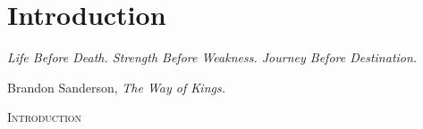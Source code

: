 \chapter{Introduction}
\label{ch:introduction}

\setlength{}
\epigraph{\itshape Life Before Death. Strength Before Weakness. Journey Before Destination.}{Brandon Sanderson, \textit{The Way of Kings.}}

\lettrine{I}{ntroduction} \lipsum[1-4]
